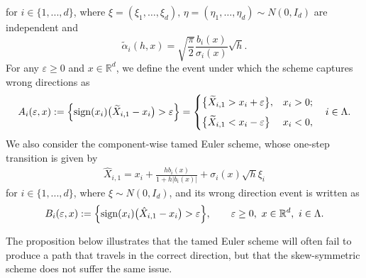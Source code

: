 \documentclass[11pt]{article}
\begin{document}
% 
for $i \in \{1,...,d\}$, where $\xi = (\xi_1, \ldots, \xi_d), \, \eta = (\eta_1, \ldots, \eta_d) \sim N(0, I_d)$ are independent and
% 
\[
\tilde{\alpha}_i (h, x) = \sqrt{\frac{\pi}{2}} \frac{b_i (x)}{\sigma_i (x)} \sqrt{h}. 
\]
% 
For any $\varepsilon \ge 0$ and $x \in \mathbb{R}^d$, we define the event under which the scheme captures wrong directions as
% 
\begin{align*}
A_{i} (\varepsilon, x) := \Bigl\{  \mathrm{sign} (x_i) \bigl( \widetilde{X}_{i, 1} -  x_i \bigr) > \varepsilon \Bigr\}
= \begin{cases}  
\bigl\{ 
\widetilde{X}_{i, 1} >  x_i  + \varepsilon \bigr\},  & x_i > 0; \\[0.2cm] 
\bigl\{ 
\widetilde{X}_{i, 1} <  x_i  - \varepsilon   \bigr\} & x_i < 0,   
\end{cases} \quad i \in \Lambda.   
\end{align*}
% 
We also consider the component-wise tamed Euler scheme, whose one-step transition is given by
% 
\begin{align} \label{eq:te_one_step}
\hat{X}_{i, 1}
= x_i + \frac{h b_i (x)}{1 + h | b_i (x)|} + \sigma_i (x) \sqrt{h} \xi_i
\end{align} 
% 
for $i \in \{1,...,d\}$, where $\xi \sim N(0, I_d)$, and its wrong direction event is written as 
% 
\begin{align}
B_{i} (\varepsilon, x) := \Bigl\{ 
\mathrm{sign} (x_i) \bigl( \hat{X}_{i, 1} -  x_i \bigr) > \varepsilon \Bigr\}, \qquad \varepsilon \ge 0, \ x \in \mathbb{R}^d,  \ i \in \Lambda.
\end{align}    

% 

The proposition below illustrates that the tamed Euler scheme will often fail to produce a path that travels in the correct direction, but that the skew-symmetric scheme does not suffer the same issue.
\end{document}
